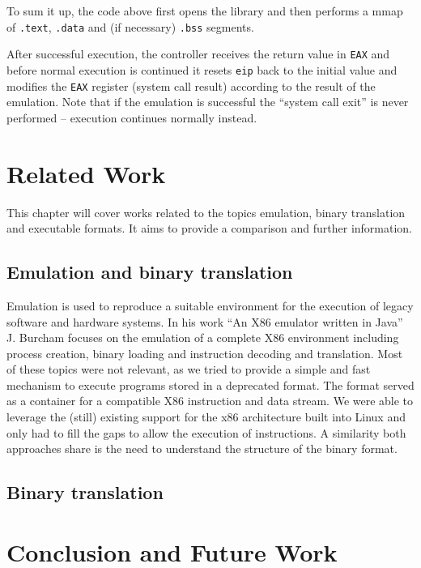 \documentclass[draft,final]{vutinfth} %
\begin{document}
To sum it up, the code above first opens the library and then performs a mmap of \texttt{.text}, \texttt{.data} and (if necessary) \texttt{.bss} segments.

After successful execution, the controller receives the return value in \texttt{EAX} and before normal execution is continued it resets \texttt{eip} back to the initial value and modifies the \texttt{EAX} register (system call result) according to the result of the emulation. Note that if the emulation is successful the ``system call exit'' is never performed -- execution continues normally instead.

\chapter{Related Work}

This chapter will cover works related to the topics emulation, binary translation and executable formats. It aims to provide a comparison and further information.

\section{Emulation and binary translation}

Emulation is used to reproduce a suitable environment for the execution of legacy software and hardware systems. In his work ``An X86 emulator written in Java'' \cite{JBurcham} J. Burcham focuses on the emulation of a complete X86 environment including process creation, binary loading and instruction decoding and translation. Most of these topics were not relevant, as we tried to provide a simple and fast mechanism to execute programs stored in a deprecated format. The format served as a container for a compatible X86 instruction and data stream. We were able to leverage the (still) existing support for the x86 architecture built into Linux and only had to fill the gaps to allow the execution of instructions. A similarity both approaches share is the need to understand the structure of the binary format.

\section{Binary translation}

\chapter{Conclusion and Future Work}
\end{document}
